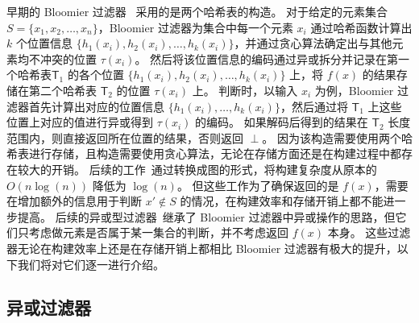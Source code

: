早期的 Bloomier 过滤器~\cite{chazelle2004bloomier} 采用的是两个哈希表的构造。
对于给定的元素集合 $S= \{x_1, x_2, \dots, x_n\}$，Bloomier 过滤器为集合中每一个元素 $x_i$ 通过哈希函数计算出 $k$ 个位置信息 $\{h_1(x_i), h_2(x_i), \dots, h_k(x_i)\}$，并通过贪心算法确定出与其他元素均不冲突的位置 $\tau(x_i)$。
然后将该位置信息的编码通过异或拆分并记录在第一个哈希表$\mathsf{T}_1$ 的各个位置 $\{h_1(x_i), h_2(x_i), \dots, h_k(x_i)\}$ 上，将 $f(x)$ 的结果存储在第二个哈希表 $\mathsf{T}_2$ 的位置 $\tau(x_i)$ 上。
判断时，以输入 $x_i$ 为例，Bloomier 过滤器首先计算出对应的位置信息 $\{h_1(x_i), \dots, h_k(x_i)\}$，然后通过将 $\mathsf{T}_1$ 上这些位置上对应的值进行异或得到 $\tau(x_i)$ 的编码。
如果解码后得到的结果在 $\mathsf{T}_2$ 长度范围内，则直接返回所在位置的结果，否则返回 $\perp$。
因为该构造需要使用两个哈希表进行存储，且构造需要使用贪心算法，无论在存储方面还是在构建过程中都存在较大的开销。
后续的工作~\cite{charles2008bloomier}通过转换成图的形式，将构建复杂度从原本的 $O(n\log(n))$ 降低为 $\log(n)$。
但这些工作为了确保返回的是 $f(x)$，需要在增加额外的信息用于判断 $x'\notin S$ 的情况，在构建效率和存储开销上都不能进一步提高。
后续的异或型过滤器~\cite{graf2020xor,dillinger2021ribbon,graf2022binary}继承了 Bloomier 过滤器中异或操作的思路，但它们只考虑做元素是否属于某一集合的判断，并不考虑返回 $f(x)$ 本身。
这些过滤器无论在构建效率上还是在存储开销上都相比 Bloomier 过滤器有极大的提升，以下我们将对它们逐一进行介绍。




\subsection{异或过滤器}


